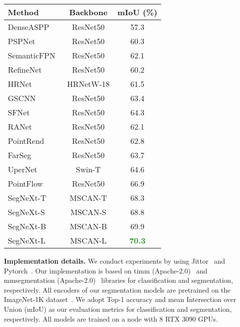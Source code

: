 \documentclass{article}
\begin{document}
\begin{table}[t]
\begin{minipage}{0.5\textwidth}
\begin{tabular}{l|c|c}
    \toprule
	Method & Backbone & mIoU (\%)  \\
    \midrule
	DenseASPP~\cite{yang2018denseaspp} & ResNet50  & 57.3  \\ 
	PSPNet~\cite{zhao2017pyramid}  & ResNet50 & 60.3  \\ 
	SemanticFPN~\cite{kirillov2019panoptic} & ResNet50  & 62.1  \\ 
	RefineNet~\cite{lin2017refinenet}  & ResNet50 & 60.2  \\ 
	HRNet~\cite{wang2020deep} & HRNetW-18 & 61.5  \\ 
	GSCNN~\cite{takikawa2019gated} & ResNet50 & 63.4  \\ 
	SFNet~\cite{li2020semantic} & ResNet50 & 64.3  \\ 
	RANet~\cite{mou2019relation} & ResNet50  & 62.1  \\ 
	PointRend~\cite{kirillov2020pointrend} & ResNet50 & 62.8  \\ 
	FarSeg~\cite{zheng2020foreground} & ResNet50 & 63.7  \\ 
	UperNet~\cite{xiao2018unified} & Swin-T & 64.6   \\ 
	PointFlow~\cite{li2021pointflow} & ResNet50 & 66.9  \\ 
	\midrule
	SegNeXt-T & MSCAN-T & 68.3  \\ 
	SegNeXt-S & MSCAN-S & 68.8  \\ 
	SegNeXt-B & MSCAN-B & 69.9  \\ 
	SegNeXt-L & MSCAN-L & \textbf{\textcolor{ForestGreen}{70.3}}  \\ 
    \bottomrule
  \end{tabular}
  \label{tab:isaid}
  \end{minipage}
\vspace{-0.2cm}
\end{table}



\textbf{Implementation details.}
We conduct experiments by using Jittor~\cite{hu2020jittor} and Pytorch~\cite{paszke2019pytorch}.
Our implementation is based on timm (Apache-2.0)~\cite{rw2019timm} and mmsegmentation (Apache-2.0)~\cite{mmseg2020} libraries for classification and segmentation, respectively.
All encoders of our segmentation models are pretrained on the ImageNet-1K dataset~\cite{deng2009imagenet}.
We adopt Top-1 accuracy and mean Intersection over Union (mIoU) as 
our evaluation metrics for classification and segmentation, respectively.
All models are trained on a node with 8 RTX 3090 GPUs.
\end{document}
